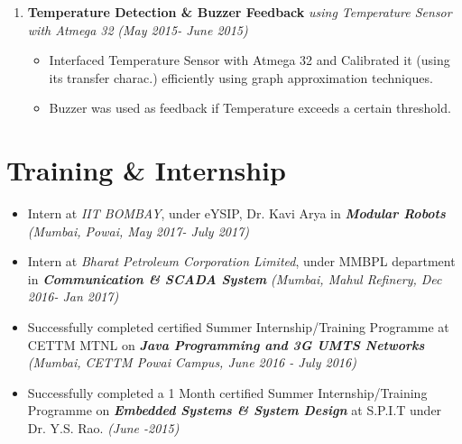 \documentclass[10pt,a4paper,sans]{moderncv} %
\begin{document}
\begin{enumerate}
\item \textbf{Temperature Detection \& Buzzer Feedback} \textit{ using Temperature Sensor  with Atmega 32}  \textit{ (May 2015- June 2015) }
\begin{itemize}
\item Interfaced Temperature Sensor with Atmega 32 and Calibrated it (using its transfer charac.) efficiently using graph approximation techniques.
\item Buzzer was used as feedback if Temperature exceeds a certain threshold.
\end{itemize}

\end{enumerate}




\section{Training \& Internship}

\begin{itemize}

\item Intern at\textit{ IIT BOMBAY}, under eYSIP, Dr. Kavi Arya in \textbf{\textit{Modular Robots }}\textit{ (Mumbai, Powai,  May 2017- July 2017) } \newline

\item Intern at\textit{ Bharat Petroleum Corporation Limited}, under MMBPL department in \textbf{\textit{Communication \& SCADA System }}\textit{ (Mumbai, Mahul Refinery, Dec 2016- Jan 2017) } \newline

\item Successfully completed certified Summer Internship/Training Programme at CETTM MTNL on \textbf{\textit{Java Programming and 3G UMTS Networks}}                        \textit {(Mumbai, CETTM Powai Campus, June 2016 -  July 2016) } \newline

\item Successfully completed a 1 Month certified Summer Internship/Training Programme on \textbf{\textit {Embedded Systems \& System Design}} at S.P.I.T under Dr. Y.S. Rao.    \textit { (June -2015) }


\end{itemize}
\end{document}
